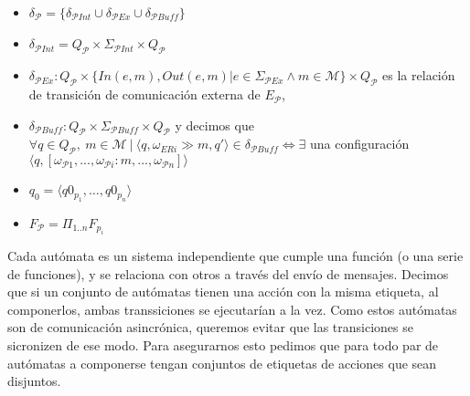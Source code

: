 \begin{definition}[Composición]
\begin{itemize}

\item $\delta_{\mathcal{P}} = \{\delta_{\mathcal{P}\mathit{Int}} \cup \delta_{\mathcal{P}\mathit{Ex}} \cup \delta_{\mathcal{P}\mathit{Buff}}\}$

\item $\delta_{\mathcal{P}\mathit{Int}} = Q_{\mathcal{P}} \times \Sigma_{\mathcal{P}\mathit{Int}} \times Q_{\mathcal{P}} $

\item $\delta_{\mathcal{P}\mathit{Ex}}: Q_{\mathcal{P}} \times \{\mathit{In}(e,m), \mathit{Out}(e,m) | e \in \Sigma_{\mathcal{P}\mathit{Ex}} \land m \in \mathcal{M}\} \times Q_{\mathcal{P}}$ es la relación de transición de comunicación externa de $E_\mathcal{P}$,
\item $\delta_{\mathcal{P}\mathit{Buff}}: Q_{\mathcal{P}} \times \Sigma_{\mathcal{P}\mathit{Buff}} \times Q_{\mathcal{P}}$ y decimos que $\forall q \in Q_\mathit{\mathcal{P}}, \ m \in \mathcal{M} \ |	 \ \langle q, \omega_\mathit{ERi} \gg m, q' \rangle \in \delta_\mathit{\mathcal{P}Buff} \iff \exists$ una configuración $ \langle q, [\omega_\mathit{\mathcal{P}1},...,\omega_\mathit{\mathcal{P}i}:m, ..., \omega_\mathit{\mathcal{P}n}] \rangle$ 
\item $q_0 = \langle q0_{p_1},\ldots,q0_{p_n} \rangle$
\item $F_{\mathcal{P}} = \Pi_{1..n}F_{p_i}$

\end{itemize}


Cada autómata es un sistema independiente que cumple una función (o una serie de funciones), y se relaciona con otros a través del envío de mensajes. Decimos que si un conjunto de autómatas tienen una acción con la misma etiqueta, al componerlos, ambas transsiciones se ejecutarían a la vez. Como estos autómatas son de comunicación asincrónica, queremos evitar que las transiciones se sicronizen de ese modo. Para asegurarnos esto pedimos que para todo par de autómatas a componerse tengan conjuntos de etiquetas de acciones que sean disjuntos. 


\end{definition}
